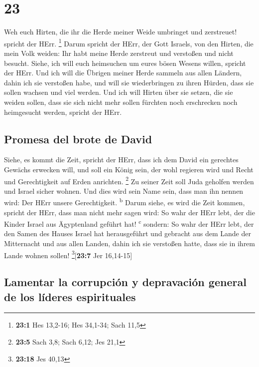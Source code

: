 \hypertarget{section-22}{%
\section{23}\label{section-22}}

 Weh euch Hirten, die ihr die Herde meiner Weide umbringet
und zerstreuet! spricht der HErr. \footnote{\textbf{23:1} Hes 13,2-16;
  Hes 34,1-34; Sach 11,5}  Darum spricht der HErr, der
Gott Israels, von den Hirten, die mein Volk weiden: Ihr habt meine Herde
zerstreut und verstoßen und nicht besucht. Siehe, ich will euch
heimsuchen um eures bösen Wesens willen, spricht der HErr.
 Und ich will die Übrigen meiner Herde sammeln aus allen
Ländern, dahin ich sie verstoßen habe, und will sie wiederbringen zu
ihren Hürden, dass sie sollen wachsen und viel werden. 
Und ich will Hirten über sie setzen, die sie weiden sollen, dass sie
sich nicht mehr sollen fürchten noch erschrecken noch heimgesucht
werden, spricht der HErr.

\hypertarget{promesa-del-brote-de-david}{%
\subsection{Promesa del brote de
David}\label{promesa-del-brote-de-david}}

 Siehe, es kommt die Zeit, spricht der HErr, dass ich dem
David ein gerechtes Gewächs erwecken will, und soll ein König sein, der
wohl regieren wird und Recht und Gerechtigkeit auf Erden anrichten.
\footnote{\textbf{23:5} Sach 3,8; Sach 6,12; Jes 21,1}  Zu
seiner Zeit soll Juda geholfen werden und Israel sicher wohnen. Und dies
wird sein Name sein, dass man ihn nennen wird: Der HErr unsere
Gerechtigkeit. \textsuperscript{b}  Darum siehe, es wird
die Zeit kommen, spricht der HErr, dass man nicht mehr sagen wird: So
wahr der HErr lebt, der die Kinder Israel aus Ägyptenland geführt hat!
\textsuperscript{c}  sondern: So wahr der HErr lebt, der
den Samen des Hauses Israel hat herausgeführt und gebracht aus dem Lande
der Mitternacht und aus allen Landen, dahin ich sie verstoßen hatte,
dass sie in ihrem Lande wohnen sollen! \footnote{\textbf{23:18} Jes
  40,13}{[}\textbf{23:7} Jer 16,14-15{]}

\hypertarget{lamentar-la-corrupciuxf3n-y-depravaciuxf3n-general-de-los-luxedderes-espirituales}{%
\subsection{Lamentar la corrupción y depravación general de los líderes
espirituales}\label{lamentar-la-corrupciuxf3n-y-depravaciuxf3n-general-de-los-luxedderes-espirituales}}

